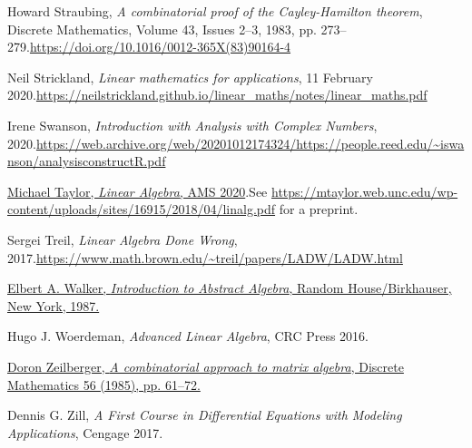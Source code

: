 \documentclass[numbers=enddot,12pt,final,onecolumn,notitlepage]{scrartcl}%
\numberwithin{exer}{subsection}
\theoremstyle{definition}
\begin{document}
\begin{thebibliography}{99999999}
Howard Straubing, \textit{A combinatorial proof of
the Cayley-Hamilton theorem}, Discrete Mathematics, Volume 43, Issues 2--3,
1983, pp. 273--279.\newline\url{https://doi.org/10.1016/0012-365X(83)90164-4}

Neil Strickland, \textit{Linear mathematics for
applications}, 11 February 2020.\newline\url{https://neilstrickland.github.io/linear_maths/notes/linear_maths.pdf}

Irene Swanson, \textit{Introduction with Analysis
with Complex Numbers}, 2020.\newline\url{https://web.archive.org/web/20201012174324/https://people.reed.edu/~iswanson/analysisconstructR.pdf}

%
\href{https://bookstore.ams.org/amstext-45/}{Michael Taylor, \textit{Linear
Algebra}, AMS 2020}.\newline See
\url{https://mtaylor.web.unc.edu/wp-content/uploads/sites/16915/2018/04/linalg.pdf}
for a preprint.

Sergei Treil, \textit{Linear Algebra Done Wrong},
2017.\newline\url{https://www.math.brown.edu/~treil/papers/LADW/LADW.html}

%
\href{https://web.archive.org/web/20170809055317/https://www.math.nmsu.edu/~elbert/AbsAlgeb.pdf}{Elbert
A. Walker, \textit{Introduction to Abstract Algebra}, Random House/Birkhauser,
New York, 1987.}

Hugo J. Woerdeman, \textit{Advanced Linear
Algebra}, CRC Press 2016.

%
\href{http://www.math.rutgers.edu/~zeilberg/mamarimY/DM85.pdf}{Doron
Zeilberger, \textit{A combinatorial approach to matrix algebra}, Discrete
Mathematics 56 (1985), pp. 61--72.}

Dennis G. Zill, \textit{A First Course in Differential
Equations with Modeling Applications}, Cengage 2017.
\end{thebibliography}
\end{document}
